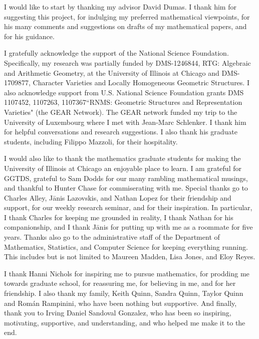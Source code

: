 \acknowledgment

I would like to start by thanking my advisor David Dumas.
I thank him for suggesting this project, for indulging my preferred mathematical viewpoints, for his many comments and suggestions on drafts of my mathematical papers, and for his guidance.

I gratefully acknowledge the support of the National Science Foundation. Specifically, my research was partially funded by DMS-1246844, RTG: Algebraic and Arithmetic Geometry, at the University of Illinois at Chicago and DMS-1709877, Character Varieties and Locally Homogeneous Geometric Structures. 
I also acknowledge support from U.S. National Science Foundation grants DMS 1107452, 1107263, 1107367``RNMS: Geometric Structures and Representation Varieties" (the GEAR Network).
The GEAR network funded my trip to the University of Luxembourg where I met with Jean-Marc Schlenker. 
I thank him for helpful conversations and research suggestions.
I also thank his graduate students, including Filippo Mazzoli, for their hospitality.  

I would also like to thank the mathematics graduate students for making the University of Illinois at Chicago an enjoyable place to learn. 
I am grateful for GGTDS, grateful to Sam Dodds for our many rambling mathematical musings, and thankful to Hunter Chase for commiserating with me. 
Special thanks go to Charles Alley, J\=anis Lazovskis, and Nathan Lopez for their friendship and support, for our weekly research seminar, and for their inspiration.
In particular, I thank Charles for keeping me grounded in reality, I thank Nathan for his companionship, and I thank J\=anis for putting up with me as a roommate for five years. 
Thanks also go to the administrative staff of the Department of Mathematics, Statistics, and Computer Science for keeping everything running. This includes but is not limited to Maureen Madden, Lisa Jones, and Eloy Reyes.

I thank Hanni Nichols for inspiring me to pursue mathematics, for prodding me towards graduate school, for reassuring me, for believing in me, and for her friendship.
I also thank my family, Keith Quinn, Sandra Quinn, Taylor Quinn and Rom\'an Rampinini, who have been nothing but supportive. 
And finally, thank you to Irving Daniel Sandoval Gonzalez, who has been so inspiring, motivating, supportive, and understanding, and who helped me make it to the end.

